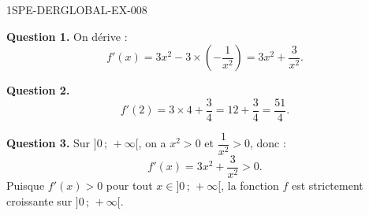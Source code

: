 \begin{corrige}{1SPE-DERGLOBAL-EX-008}

\textbf{Question 1.} On dérive :
\[
f'(x) = 3x^2 - 3 \times \left(-\frac{1}{x^2}\right) = \boxed{3x^2 + \frac{3}{x^2}}.
\]

\textbf{Question 2.}
\[
f'(2) = 3 \times 4 + \frac{3}{4} = 12 + \frac{3}{4} = \frac{51}{4}.
\]

\textbf{Question 3.} Sur $]0\,;\,+\infty[$, on a $x^2 > 0$ et $\dfrac{1}{x^2} > 0$, donc :
\[
f'(x) = 3x^2 + \frac{3}{x^2} > 0.
\]
Puisque $f'(x) > 0$ pour tout $x \in ]0\,;\,+\infty[$, la fonction $f$ est strictement croissante sur $]0\,;\,+\infty[$.
\end{corrige}
